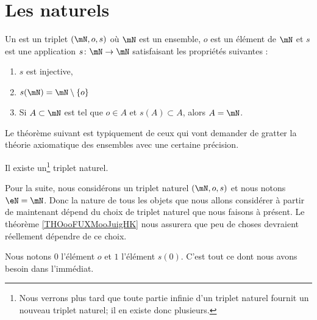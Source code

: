 \section{Les naturels}
\label{SECooPJSYooNYaIaq}

\begin{definition}     \label{DEFooBJBOooWlblAx}
	Un  est un triplet \( (\mN, o, s)\) où \( \mN\) est un ensemble, \( o\) est un élément de \( \mN\) et \( s\) est une application \( s\colon \mN\to \mN\) satisfaisant les propriétés suivantes :
	\begin{enumerate}
		\item
		      \( s\) est injective,
		\item       \label{ITEMooQAKJooGKdJsM}
		      \( s(\mN)=\mN\setminus \{ o \} \)
		\item       \label{ITEMooXPYEooFajywh}
		      Si \( A\subset \mN\) est tel que \( o\in A\) et \( s(A)\subset A\), alors \( A=\mN\).
	\end{enumerate}
\end{definition}

Le théorème suivant est typiquement de ceux qui vont demander de gratter la théorie axiomatique des ensembles avec une certaine précision.
\begin{theorem}     \label{THOooOXMHooXYgMqb}
	Il existe un\footnote{Nous verrons plus tard que toute partie infinie d'un triplet naturel fournit un nouveau triplet naturel; il en existe donc plusieurs.} triplet naturel.
\end{theorem}

\begin{normaltext}[Définition de \( \eN\)]
	Pour la suite, nous considérons un triplet naturel \( (\mN,o,s)\) et nous notons \( \eN=\mN\). Donc la nature de tous les objets que nous allons considérer à partir de maintenant dépend du choix de triplet naturel que nous faisons à présent. Le théorème \ref{THOooFUXMooJuigHK} nous assurera que peu de choses devraient réellement dépendre de ce choix.

	Nous notons \( 0\) l'élément \( o\) et \( 1\) l'élément \( s(0)\). C'est tout ce dont nous avons besoin dans l'immédiat.
\end{normaltext}

